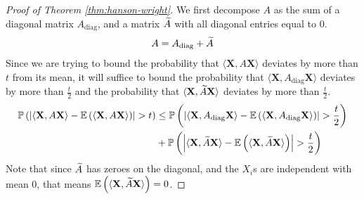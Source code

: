 \documentclass[11pt]{article}
\begin{document}
\begin{proof}[Proof of Theorem \ref{thm:hanson-wright}]
  We first decompose $A$ as the sum of a diagonal matrix $A_{\mathrm{diag}}$, and a matrix $\widetilde{A}$ with all diagonal entries equal to $0$.
  \begin{align*}
    A = A_{\mathrm{diag}} + \widetilde{A}
  \end{align*}
  Since we are trying to bound the probability that $\langle \mathbf{X}, A \mathbf{X} \rangle$ deviates by more than $t$ from its mean, it will suffice to bound the probability that $\langle \mathbf{X}, A_{\mathrm{diag}}\mathbf{X} \rangle$ deviates by more than $\frac{t}{2}$ and the probability that $\langle \mathbf{X}, \widetilde{A} \mathbf{X} \rangle$ deviates by more than $\frac{t}{2}$.
  \begin{align*}
    \mathbb{P}\left( \left| \langle \mathbf{X}, A \mathbf{X} \rangle - \mathbb{E}\left( \langle \mathbf{X}, A \mathbf{X} \rangle \right) \right| > t \right)
    &\leq \mathbb{P}\left( \left| \langle \mathbf{X}, A_{\mathrm{diag}} \mathbf{X} \rangle - \mathbb{E}\left( \langle \mathbf{X}, A_{\mathrm{diag}} \mathbf{X} \rangle \right) \right| > \frac{t}{2} \right) \\
      &+ \mathbb{P}\left( \left| \langle \mathbf{X}, \widetilde{A} \mathbf{X} \rangle - \mathbb{E}\left( \langle \mathbf{X}, \widetilde{A} \mathbf{X} \rangle \right) \right| > \frac{t}{2} \right)
  \end{align*}
  Note that since $\widetilde{A}$ has zeroes on the diagonal, and the $X_i$s are independent with mean $0$, that means $\mathbb{E}\left( \langle \mathbf{X}, \widetilde{A} \mathbf{X} \rangle \right) = 0$.


\end{proof}
\end{document}
